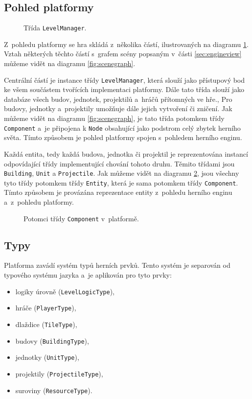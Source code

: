 \subsection{Pohled platformy}
\label{sec:platformimpl}

\begin{figure}[h]
	\centering
	\fontsize{8pt}{11pt}\selectfont
	\def\svgwidth{\textwidth}
	
	\caption{Třída \texttt{LevelManager}.}
	\label{fig:platform}
\end{figure}

Z~pohledu platformy se hra skládá z~několika částí, ilustrovaných na diagramu \ref{fig:platform}. Vztah některých těchto částí s~grafem scény popsaným v~části \ref{sec:engineview} můžeme vidět na diagramu \ref{fig:scenegraph}.

Centrální částí je instance třídy \texttt{LevelManager}, která slouží jako přístupový bod ke všem součástem tvořících implementaci platformy. Dále tato třída slouží jako databáze všech budov, jednotek, projektilů a~hráčů přítomných ve hře., Pro budovy, jednotky a~projektily umožňuje dále jejich vytvoření či zničení. Jak můžeme vidět na diagramu \ref{fig:scenegraph}, je tato třída potomkem třídy \texttt{Component} a~je připojena k \texttt{Node} obsahující jako podstrom celý zbytek herního světa. Tímto způsobem je pohled platformy spojen s~pohledem herního enginu.

Každá entita, tedy každá budova, jednotka či projektil je reprezentována instancí odpovídající třídy implementující chování tohoto druhu. Těmito třídami jsou \texttt{Building}, \texttt{Unit} a \texttt{Projectile}. Jak můžeme vidět na diagramu \ref{fig:componenthierarchy}, jsou všechny tyto třídy potomkem třídy \texttt{Entity}, která je sama potomkem třídy \texttt{Component}. Tímto způsobem je provázána reprezentace entity z~pohledu herního enginu a~z~pohledu platformy. 


\begin{figure}[h]
	\centering
	\fontsize{9pt}{11pt}\selectfont
	\def\svgwidth{0.7\textwidth}
	
	\caption{Potomci třídy \texttt{Component} v~platformě.}
	\label{fig:componenthierarchy}
\end{figure}

\subsection{Typy}
\label{sec:types}
Platforma zavádí systém typů herních prvků. Tento systém je separován od typového systému jazyka a~je aplikován pro tyto prvky:
\begin{itemize}
	\item logiky úrovně (\texttt{LevelLogicType}),
	\item hráče (\texttt{PlayerType}),
	\item dlaždice (\texttt{TileType}),
	\item budovy (\texttt{BuildingType}),
	\item jednotky (\texttt{UnitType}),
	\item projektily (\texttt{ProjectileType}),
	\item suroviny (\texttt{ResourceType}).
\end{itemize}

